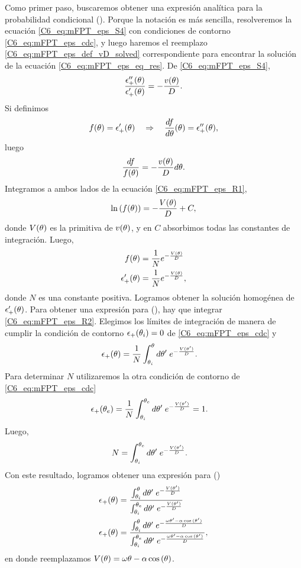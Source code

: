\documentclass[./main.tex]{subfiles}
\begin{document}
Como primer paso, buscaremos obtener una expresión analítica para la probabilidad condicional \epsplus(\xx). Porque la notación es más sencilla, resolveremos la ecuación \ref{C6_eq:mFPT_eps_S4} con condiciones de contorno \ref{C6_eq:mFPT_eps_cdc}, y luego haremos el reemplazo \ref{C6_eq:mFPT_eps_def_vD_solved} correspondiente para encontrar la solución de la ecuación \ref{C6_eq:mFPT_eps_eq_res}. De \ref{C6_eq:mFPT_eps_S4},
\begin{align}
     \frac{\epsilon_{+}''(\theta)}{\epsilon_{+}'(\theta)} = - \frac{v(\theta)}{D}.
\end{align}
Si definimos 
\begin{align*}
     f(\theta) = \epsilon_{+}'(\theta) \quad \Rightarrow \quad \frac{d f}{d\theta}(\theta) = \epsilon_{+}''(\theta),
\end{align*}
luego
\begin{align}
     \frac{df}{f(\theta)} = - \frac{v(\theta)}{D} d\theta.
     \label{C6_eq:mFPT_eps_R1}
\end{align}
Integramos a ambos lados de la ecuación \ref{C6_eq:mFPT_eps_R1}, 
\begin{align}
     \ln{(f(\ensuremath{\theta}))} = - \frac{V(\theta)}{D} + C,
\end{align}
donde $V(\theta)$ es la primitiva de $v(\theta)$, y en $C$ absorbimos todas las constantes de integración. Luego,
\begin{align}
     f(\theta) &= \frac{1}{N} e^{- \frac{V(\theta)}{D}} \nonumber \\
     \epsilon_{+}'(\theta) & =\frac{1}{N} e^{- \frac{V(\theta)}{D}}, 
     \label{C6_eq:mFPT_eps_R2}
\end{align}
donde $N$ es una constante positiva. Logramos obtener la solución homogénea de $\epsilon_{+}'(\theta)$. Para obtener una expresión para \epsplus(\xx), hay que integrar \ref{C6_eq:mFPT_eps_R2}. Elegimos los límites de integración de manera de cumplir la condición de contorno $\epsilon_{+}(\theta_i) = 0 $ de \ref{C6_eq:mFPT_eps_cdc} y
\begin{align}
     \epsilon_{+}(\theta) & = \frac{1}{N} \int_{\theta_i}^\theta d\theta'\; e^{- \frac{V(\theta')}{D}}  .  \label{C6_eq:mFPT_N_epsplus}
\end{align}
Para determinar $N$ utilizaremos la otra condición de contorno de \ref{C6_eq:mFPT_eps_cdc}
\begin{align}
     \epsilon_{+}(\theta_e) & = \frac{1}{N} \int_{\theta_i}^{\theta_e} d\theta'\; e^{- \frac{V(\theta')}{D}} = 1. 
\end{align}
Luego,
\begin{align}
      N &= \int_{\theta_i}^{\theta_e} d\theta'\; e^{- \frac{V(\theta')}{D}} .
\end{align}
Con este resultado, logramos obtener una expresión para \epsplus(\xx) 
\begin{align}
     \epsplus(\xx) & = \frac{\int_{\xxi}^\xx d\xx'\; e^{- \frac{V(\xx')}{D}}}{\int_{\xxi}^{\xxe} d\xx'\; e^{- \frac{V(\xx')}{D}}} \\
     \epsplus(\xx) & = \frac{\int_{\xxi}^\xx d\xx'\; e^{- \frac{\omega \xx' - \alpha \cos{(\xx')}}{D}}}{\int_{\xxi}^{\xxe} d\xx'\; e^{- \frac{\omega \xx' - \alpha \cos{(\xx')}}{D}}},
     \label{C6_eq:mFPT_eps_res}
\end{align}
en donde reemplazamos $V(\theta) = \omega \theta - \alpha \cos{(\ensuremath{\theta})}$.
\end{document}
